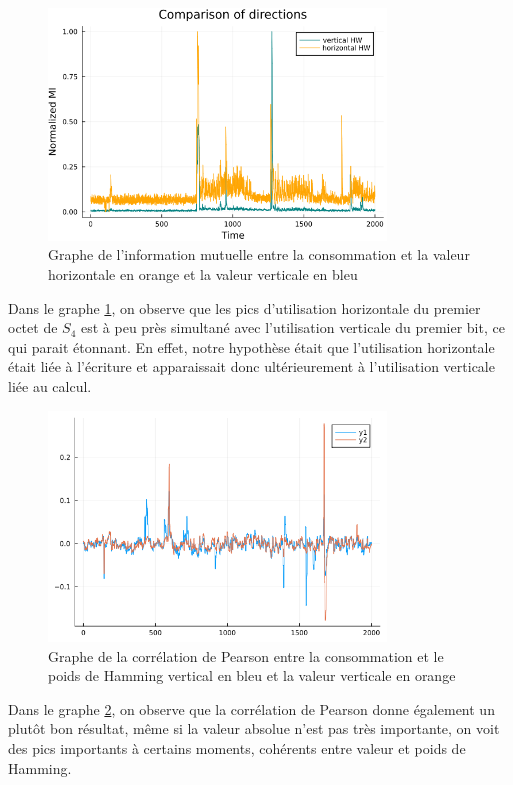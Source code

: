\documentclass[12pt]{article}
\begin{document}
	\begin{figure}[H]
		\centering
		\includegraphics[width=0.8\textwidth]{img_files/h_and_v_one_byte}
		\caption{Graphe de l'information mutuelle entre la consommation et la valeur horizontale en orange et la valeur verticale en bleu}
		\label{hvval}
	\end{figure}
	
	Dans le graphe \ref{hvval}, on observe que les pics d'utilisation horizontale du premier octet de $S_4$ est à peu près simultané avec l'utilisation verticale du premier bit, ce qui parait étonnant. En effet, notre hypothèse était que l'utilisation horizontale était liée à l'écriture et apparaissait donc ultérieurement à l'utilisation verticale liée au calcul.
	
	\begin{figure}[H]
		\centering
		\includegraphics[width=0.8\textwidth]{img_files/vertical_corr}
		\caption{Graphe de la corrélation de Pearson entre la consommation et le poids de Hamming vertical en bleu et la valeur verticale en orange}
		\label{vcor}
	\end{figure}
	
	Dans le graphe \ref{vcor}, on observe que la corrélation de Pearson donne également un plutôt bon résultat, même si la valeur absolue n'est pas très importante, on voit des pics importants à certains moments, cohérents entre valeur et poids de Hamming.
	
\end{document}
